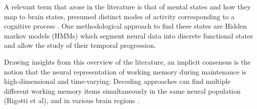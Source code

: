 A relevant term that arose in the literature is that of mental states and how they map to brain states, presumed distinct modes of activity corresponding to a cognitive process \citep{haynes2015information}.
One methodological approach to find these states are Hidden markov models (HMMs) which segment neural data into discrete functional states and allow the study of their temporal progression.


Drawing insights from this overview of the literature, an implicit consensus is the notion that the neural representation of working memory during maintenance is high-dimensional and time-varying:
Decoding approaches can find multiple different working memory items simultaneously in the same neural population (Rigotti et al), and in various brain regions \citep{curtis2010beyond}.


